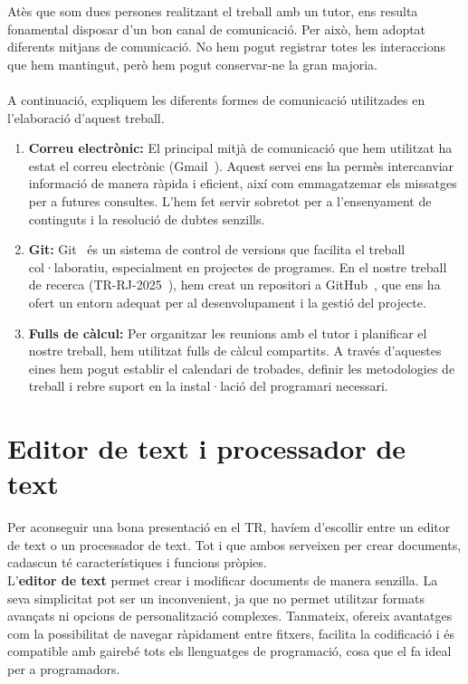 Atès que som dues persones realitzant el treball amb un tutor, ens resulta fonamental disposar d'un bon canal de comunicació. Per això, hem adoptat diferents mitjans de comunicació. No hem pogut registrar totes les interaccions que hem mantingut, però hem pogut conservar-ne la gran majoria.\\ \\
A continuació, expliquem les diferents formes de comunicació utilitzades en l'elaboració d'aquest treball.\\
\clearpage
\begin{enumerate}
\item \textbf{Correu electrònic:} El principal mitjà de comunicació que hem utilitzat ha estat el correu electrònic (Gmail~\cite{Gmail}). Aquest servei ens ha permès intercanviar informació de manera ràpida i eficient, així com emmagatzemar els missatges per a futures consultes. L’hem fet servir sobretot per a l’ensenyament de continguts i la resolució de dubtes senzills.

\item \textbf{Git:} Git~\cite{git} és un sistema de control de versions que facilita el treball col·laboratiu, especialment en projectes de programes. En el nostre treball de recerca (TR-RJ-2025~\cite{TR-RJ-2025}), hem creat un repositori a GitHub~\cite{GitHub}, que ens ha ofert un entorn adequat per al desenvolupament i la gestió del projecte.

\item \textbf{Fulls de càlcul:} Per organitzar les reunions amb el tutor i planificar el nostre treball, hem utilitzat fulls de càlcul \cite{FullDeCàlcul} compartits. A través d’aquestes eines hem pogut establir el calendari de trobades, definir les metodologies de treball i rebre suport en la instal·lació del programari necessari.
\end{enumerate}

\section{Editor de text i processador de text}\label{sec:4.2}

Per aconseguir una bona presentació en el TR, havíem d’escollir entre un editor de text o un processador de text. Tot i que ambos serveixen per crear documents, cadascun té característiques i funcions pròpies.\\

L’\textbf{editor de text} permet crear i modificar documents de manera senzilla. La seva simplicitat pot ser un inconvenient, ja que no permet utilitzar formats avançats ni opcions de personalització complexes. Tanmateix, ofereix avantatges com la possibilitat de navegar ràpidament entre fitxers, facilita la codificació i és compatible amb gairebé tots els llenguatges de programació, cosa que el fa ideal per a programadors.\\


